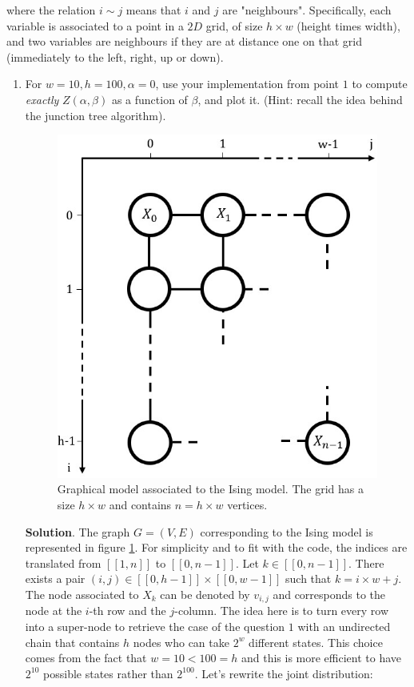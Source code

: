\documentclass[a4paper, 11pt]{article}
\begin{document}
where the relation $i \sim j$ means that $i$ and $j$ are "neighbours". Specifically, each variable is associated to a point in a $2D$ grid, of size $h \times w$ (height times width), and two variables are neighbours if they are at distance one on that grid (\ie immediately to the left, right, up or down).

\begin{enumerate}[resume]
    \item For $w = 10, h = 100, \alpha = 0$, use your implementation from point $1$ to compute \emph{exactly} $Z \left( \alpha, \beta \right)$ as a function of $\beta$, and plot it. (Hint: recall the idea behind the junction tree algorithm).
    
    \begin{figure}
        \centering
        \includegraphics[scale=.7]{images/ising_model.jpg}
        \caption{Graphical model associated to the Ising model. The grid has a size $h \times w$ and contains $n = h \times w$ vertices.}
        \label{fig:ising}
    \end{figure}
    
    \textbf{Solution}. The graph $G = \left( V, E \right)$ corresponding to the Ising model is represented in figure \ref{fig:ising}. For simplicity and to fit with the code, the indices are translated from $[\![ 1, n ]\!]$ to $[\![ 0, n-1 ]\!]$. Let $k \in [\![ 0, n-1 ]\!]$. There exists a pair $(i, j) \in [\![ 0, h-1 ]\!] \times [\![ 0, w-1 ]\!]$ such that $k = i \times w + j$. The node associated to $X_k$ can be denoted by $v_{i, j}$ and corresponds to the node at the $i$-th row and the $j$-column. The idea here is to turn every row into a super-node to retrieve the case of the question $1$ with an undirected chain that contains $h$ nodes who can take $2^{w}$ different states. This choice comes from the fact that $w = 10 < 100 = h$ and this is more efficient to have $2^{10}$ possible states rather than $2^{100}$. Let's rewrite the joint distribution:
    

\end{enumerate}
\end{document}
